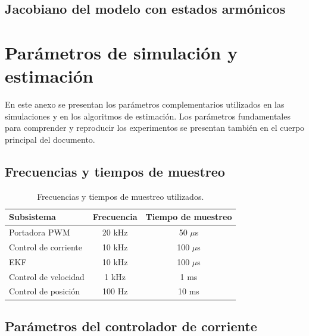 

\section{Jacobiano del modelo con estados armónicos}
\label{anexo:jacobiano_armonico}


\clearpage



\chapter{Parámetros de simulación y estimación}
\label{anexo:parametros_simulacion}

En este anexo se presentan los parámetros complementarios utilizados
en las simulaciones y en los algoritmos de estimación. Los parámetros
fundamentales para comprender y reproducir los experimentos se
presentan también en el cuerpo principal del documento.
\section{Frecuencias y tiempos de muestreo}

\begin{table}[htbp]
    \centering
    \caption{Frecuencias y tiempos de muestreo utilizados.}
    \label{tab:tiempos_muestreo}
    \begin{tabular}{lcc}
        \hline
        \textbf{Subsistema} &
        \textbf{Frecuencia} &
        \textbf{Tiempo de muestreo} \\
        \hline
        Portadora PWM          & 20 kHz & 50 $\mu$s \\
        Control de corriente   & 10 kHz & 100 $\mu$s \\
        EKF                    & 10 kHz & 100 $\mu$s \\
        Control de velocidad   & 1 kHz  & 1 ms \\
        Control de posición    & 100 Hz & 10 ms \\
        \hline
    \end{tabular}
\end{table}

\section{Parámetros del controlador de corriente}

